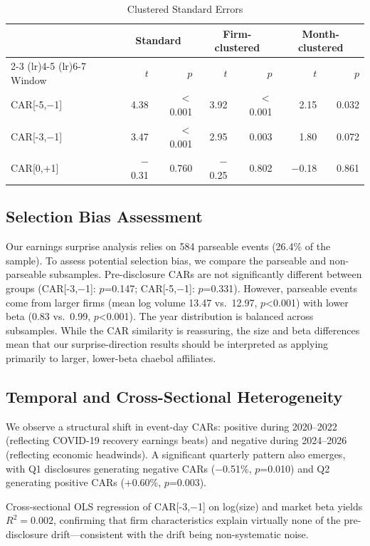 \documentclass[review,authoryear]{elsarticle}
\begin{document}
\begin{table}[H]
\centering
\caption{Clustered Standard Errors}
\label{tab:cluster}
\begin{tabular}{lrrrrrr}
\toprule
& \multicolumn{2}{c}{Standard} & \multicolumn{2}{c}{Firm-clustered} & \multicolumn{2}{c}{Month-clustered} \\
\cmidrule(lr){2-3} \cmidrule(lr){4-5} \cmidrule(lr){6-7}
Window & $t$ & $p$ & $t$ & $p$ & $t$ & $p$ \\
\midrule
CAR[-5,$-$1] & 4.38 & $<$0.001 & 3.92 & $<$0.001 & 2.15 & 0.032 \\
CAR[-3,$-$1] & 3.47 & $<$0.001 & 2.95 & 0.003 & 1.80 & 0.072 \\
CAR[0,+1] & $-$0.31 & 0.760 & $-$0.25 & 0.802 & $-$0.18 & 0.861 \\
\bottomrule
\end{tabular}
\end{table}

\subsection{Selection Bias Assessment}

Our earnings surprise analysis relies on 584 parseable events (26.4\% of the sample). To assess potential selection bias, we compare the parseable and non-parseable subsamples. Pre-disclosure CARs are not significantly different between groups (CAR[-3,$-$1]: $p$=0.147; CAR[-5,$-$1]: $p$=0.331). However, parseable events come from larger firms (mean log volume 13.47 vs.\ 12.97, $p$<0.001) with lower beta (0.83 vs.\ 0.99, $p$<0.001). The year distribution is balanced across subsamples. While the CAR similarity is reassuring, the size and beta differences mean that our surprise-direction results should be interpreted as applying primarily to larger, lower-beta chaebol affiliates.

\subsection{Temporal and Cross-Sectional Heterogeneity}

We observe a structural shift in event-day CARs: positive during 2020--2022 (reflecting COVID-19 recovery earnings beats) and negative during 2024--2026 (reflecting economic headwinds). A significant quarterly pattern also emerges, with Q1 disclosures generating negative CARs ($-$0.51\%, $p$=0.010) and Q2 generating positive CARs (+0.60\%, $p$=0.003).

Cross-sectional OLS regression of CAR[-3,$-$1] on log(size) and market beta yields $R^2=0.002$, confirming that firm characteristics explain virtually none of the pre-disclosure drift---consistent with the drift being non-systematic noise.
\end{document}
